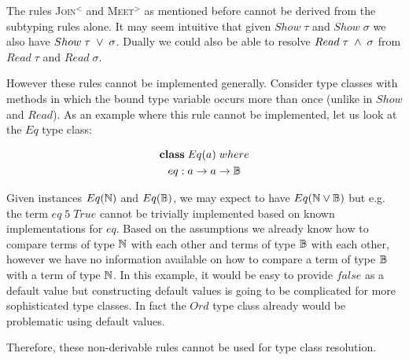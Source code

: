The rules \textsc{Join}$^<$ and \textsc{Meet}$^>$ as mentioned before cannot be derived from the subtyping rules alone.
It may seem intuitive that given $Show \; \tau$ and $Show \; \sigma$ we also have $Show \; \tau \; \vee \; \sigma$.
Dually we could also be able to resolve $Read \; \tau \; \wedge \; \sigma$ from $Read \; \tau$ and $Read \; \sigma$.

However these rules cannot be implemented generally.
Consider type classes with methods in which the bound type variable occurs more than once (unlike in $Show$ and $Read$).
As an example where this rule cannot be implemented, let us look at the $Eq$ type class:

\begin{gather}
\nonumber {\bf class} \; Eq(a) \; where\\
\nonumber  eq : a \to a \to \mathbb{B}
\end{gather}

Given instances $Eq(\mathbb{N})$ and $Eq(\mathbb{B})$, we may expect to have $Eq(\mathbb{N} \vee \mathbb{B})$ but e.g. the term $eq \; 5 \; True$ cannot be trivially implemented based on known implementations for $eq$.
Based on the assumptions we already know how to compare terms of type $\mathbb{N}$ with each other and terms of type $\mathbb{B}$ with each other,
however we have no information available on how to compare a term of type $\mathbb{B}$ with a term of type $\mathbb{N}$.
In this example, it would be easy to provide $false$ as a default value but constructing default values is going to be complicated for more sophisticated type classes.
In fact the $Ord$ type class already would be problematic using default values.

Therefore, these non-derivable rules cannot be used for type class resolution.




